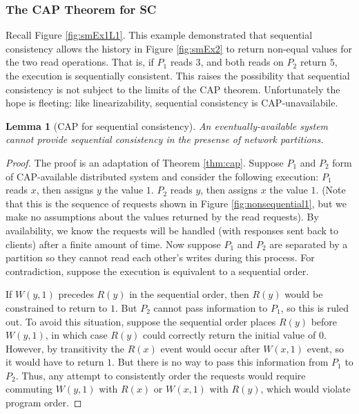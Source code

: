 \documentclass[]             %
{NASA}                       %
\newtheorem{lemma}[theorem]{Lemma}
\theoremstyle{definition}
\begin{document}
\subsubsection{The CAP Theorem for SC}

Recall Figure \ref{fig:smEx1L1}. This example demonstrated that
sequential consistency allows the history in Figure \ref{fig:smEx2} to
return non-equal values for the two read operations. That is, if $P_1$
reads $3$, and both reads on $P_2$ return $5$, the execution is
sequentially consistent. This raises the possibility that sequential
consistency is not subject to the limits of the CAP
theorem. Unfortunately the hope is fleeting: like linearizability,
sequential consistency is CAP-unavailabile.

\begin{lemma}[CAP for sequential consistency]
  \label{thm:cap-sequential}
  An eventually-available system cannot provide sequential consistency in the presense of network partitions.
\end{lemma}
\begin{proof}
  The proof is an adaptation of Theorem \ref{thm:cap}. Suppose $P_1$ and
  $P_2$ form of CAP-available distributed system and consider the
  following execution: $P_1$ reads $x$, then assigns $y$ the value
  $1$. $P_2$ reads $y$, then assigns $x$ the value $1$. (Note that this
  is the sequence of requests shown in Figure \ref{fig:nonsequential1},
  but we make no assumptions about the values returned by the read
  requests). By availability, we know the requests will be handled (with
  responses sent back to clients) after a finite amount of time. Now
  suppose $P_1$ and $P_2$ are separated by a partition so they cannot
  read each other's writes during this process. For contradiction,
  suppose the execution is equivalent to a sequential order.

  If $W(y,1)$ precedes $R(y)$ in the sequential order, then $R(y)$ would
  be constrained to return to $1$. But $P_2$ cannot pass information to
  $P_1$, so this is ruled out. To avoid this situation, suppose the
  sequential order places $R(y)$ before $W(y,1)$, in which case $R(y)$
  could correctly return the initial value of $0$. However, by
  transitivity the $R(x)$ event would occur after $W(x,1)$ event, so it
  would have to return $1$. But there is no way to pass this information
  from $P_1$ to $P_2$. Thus, any attempt to consistently order the
  requests would require commuting $W(y,1)$ with $R(x)$ or $W(x,1)$ with
  $R(y)$, which would violate program order.
\end{proof}
\end{document}
